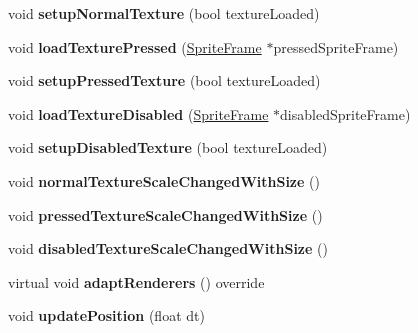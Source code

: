 \begin{DoxyCompactItemize}
void {\bfseries setup\+Normal\+Texture} (bool texture\+Loaded)
\item 
\mbox{\label{classui_1_1EditBox_a6814f726e2b21e70b8660ad26eb99a84}} 
void {\bfseries load\+Texture\+Pressed} (\hyperlink{classSpriteFrame}{Sprite\+Frame} $\ast$pressed\+Sprite\+Frame)
\item 
\mbox{\label{classui_1_1EditBox_a6dfae70c0c9597ac318f304c93abf939}} 
void {\bfseries setup\+Pressed\+Texture} (bool texture\+Loaded)
\item 
\mbox{\label{classui_1_1EditBox_ae5f067c7d435026389892fe48c7fe31f}} 
void {\bfseries load\+Texture\+Disabled} (\hyperlink{classSpriteFrame}{Sprite\+Frame} $\ast$disabled\+Sprite\+Frame)
\item 
\mbox{\label{classui_1_1EditBox_a9b2d0fe18d5fdfa696d718958afb9423}} 
void {\bfseries setup\+Disabled\+Texture} (bool texture\+Loaded)
\item 
\mbox{\label{classui_1_1EditBox_a4a79de6c38fed42a267a3d2a8fd58c03}} 
void {\bfseries normal\+Texture\+Scale\+Changed\+With\+Size} ()
\item 
\mbox{\label{classui_1_1EditBox_ab8d04719bc595b477485abdc79221556}} 
void {\bfseries pressed\+Texture\+Scale\+Changed\+With\+Size} ()
\item 
\mbox{\label{classui_1_1EditBox_a71067b37edccacc13c6dc203b9abf79c}} 
void {\bfseries disabled\+Texture\+Scale\+Changed\+With\+Size} ()
\item 
\mbox{\label{classui_1_1EditBox_a25121cc59ca27c30d401772613877a0c}} 
virtual void {\bfseries adapt\+Renderers} () override
\item 
\mbox{\label{classui_1_1EditBox_a9296bb3491261d52c6c5e92fe7d035ed}} 
void {\bfseries update\+Position} (float dt)
\end{DoxyCompactItemize}
